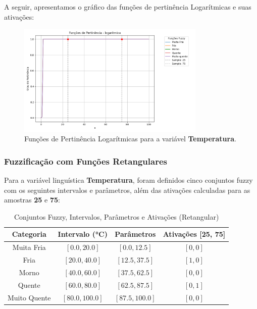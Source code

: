 \documentclass[a4paper,12pt]{article}
\begin{document}
A seguir, apresentamos o gráfico das funções de pertinência Logarítmicas e suas ativações:

\begin{figure}[H]
    \centering
    \includegraphics[width=0.8\textwidth]{img/funções_de_pertinência_logaritmica_fuzzificado.png}
    \caption{Funções de Pertinência Logarítmicas para a variável \textbf{Temperatura}.}
\end{figure}

\subsubsection{Fuzzificação com Funções Retangulares}

Para a variável linguística \textbf{Temperatura}, foram definidos cinco conjuntos fuzzy com os seguintes intervalos e parâmetros, além das ativações calculadas para as amostras \textbf{25} e \textbf{75}:

\begin{table}[H]
\centering
\caption{Conjuntos Fuzzy, Intervalos, Parâmetros e Ativações (Retangular)}
\begin{tabular}{|c|c|c|c|}
\hline
\textbf{Categoria}    & \textbf{Intervalo (°C)} & \textbf{Parâmetros}       & \textbf{Ativações [25, 75]} \\ \hline
Muita Fria            & $[0.0, 20.0]$          & $[0.0, 12.5]$             & $[0, 0]$                   \\ \hline
Fria                  & $[20.0, 40.0]$         & $[12.5, 37.5]$            & $[1, 0]$                   \\ \hline
Morno                 & $[40.0, 60.0]$         & $[37.5, 62.5]$            & $[0, 0]$                   \\ \hline
Quente                & $[60.0, 80.0]$         & $[62.5, 87.5]$            & $[0, 1]$                   \\ \hline
Muito Quente          & $[80.0, 100.0]$        & $[87.5, 100.0]$           & $[0, 0]$                   \\ \hline
\end{tabular}
\end{table}
\end{document}
